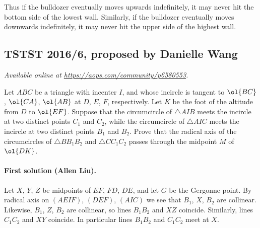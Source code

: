 \documentclass[11pt]{scrartcl}
\begin{document}
Thus if the bulldozer eventually moves upwards indefinitely,
it may never hit the bottom side of the lowest wall.
Similarly, if the bulldozer eventually moves downwards indefinitely,
it may never hit the upper side of the highest wall.
\pagebreak

\subsection{TSTST 2016/6, proposed by Danielle Wang}
\textsl{Available online at \url{https://aops.com/community/p6580553}.}
\begin{mdframed}[style=mdpurplebox,frametitle={Problem statement}]
Let $ABC$ be a triangle with incenter $I$,
and whose incircle is tangent to $\ol{BC}$, $\ol{CA}$, $\ol{AB}$
at $D$, $E$, $F$, respectively.
Let $K$ be the foot of the altitude from $D$ to $\ol{EF}$.
Suppose that the circumcircle of $\triangle AIB$
meets the incircle at two distinct points $C_1$ and $C_2$,
while the circumcircle of $\triangle AIC$ meets the incircle
at two distinct points $B_1$ and $B_2$.
Prove that the radical axis of the circumcircles of
$\triangle BB_1B_2$ and $\triangle CC_1C_2$ passes through
the midpoint $M$ of $\ol{DK}$.
\end{mdframed}
\paragraph{First solution (Allen Liu).}
Let $X$, $Y$, $Z$ be midpoints of $EF$, $FD$, $DE$,
and let $G$ be the Gergonne point.
By radical axis on $(AEIF)$, $(DEF)$, $(AIC)$
we see that $B_1$, $X$, $B_2$ are collinear.
Likewise, $B_1$, $Z$, $B_2$ are collinear,
so lines $B_1B_2$ and $XZ$ coincide.
Similarly, lines $C_1C_2$ and $XY$ coincide.
In particular lines $B_1B_2$ and $C_1C_2$ meet at $X$.
\end{document}
